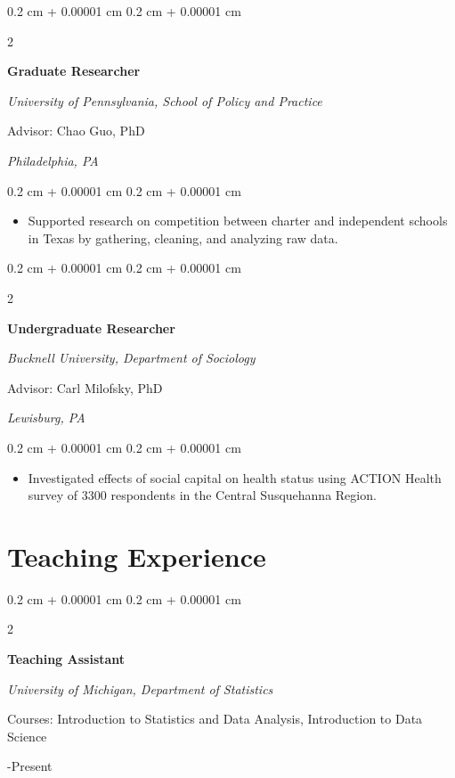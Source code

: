 \documentclass[11pt, letterpaper]{article}
\newenvironment{highlights}{
    \begin{itemize}[
        topsep=0.10 cm,
        parsep=0.10 cm,
        partopsep=0pt,
        itemsep=0pt,
        leftmargin=0.4 cm + 10pt
    ]
}{
    \end{itemize}
} %
\newenvironment{onecolentry}{
    \begin{adjustwidth}{
        0.2 cm + 0.00001 cm
    }{
        0.2 cm + 0.00001 cm
    }
}{
    \end{adjustwidth}
} %
\newenvironment{twocolentry}[2][]{
    \onecolentry
    \def\secondColumn{#2}
    \setcolumnwidth{\fill, 4.5 cm}
    \begin{paracol}{2}
}{
    \switchcolumn \raggedleft \secondColumn
    \end{paracol}
    \endonecolentry
} %
\begin{document}
\pagebreak
\begin{twocolentry}{2014

        \textit{Philadelphia, PA}
    }
    \textbf{Graduate Researcher}

    \textit{University of Pennsylvania, School of Policy and Practice}

    Advisor: Chao Guo, PhD
\end{twocolentry}

\vspace{0.05 cm}
\begin{onecolentry}
    \begin{highlights}
        \item Supported research on competition between charter and independent schools in Texas by gathering, cleaning, and analyzing raw data.
    \end{highlights}
\end{onecolentry}

\begin{twocolentry}{2013

        \textit{Lewisburg, PA}
    }
    \textbf{Undergraduate Researcher}

    \textit{Bucknell University, Department of Sociology}

    Advisor: Carl Milofsky, PhD
\end{twocolentry}

\vspace{0.05 cm}
\begin{onecolentry}
    \begin{highlights}
        \item  Investigated eﬀects of social capital on health status using ACTION Health
        survey of 3300 respondents in the Central Susquehanna Region.
    \end{highlights}
\end{onecolentry}

\section{Teaching Experience}

\begin{twocolentry}{2024-Present}
    \textbf{Teaching Assistant}

    \textit{University of Michigan, Department of Statistics}

    Courses: Introduction to Statistics and Data Analysis, Introduction to Data Science

\end{twocolentry}
\end{document}

